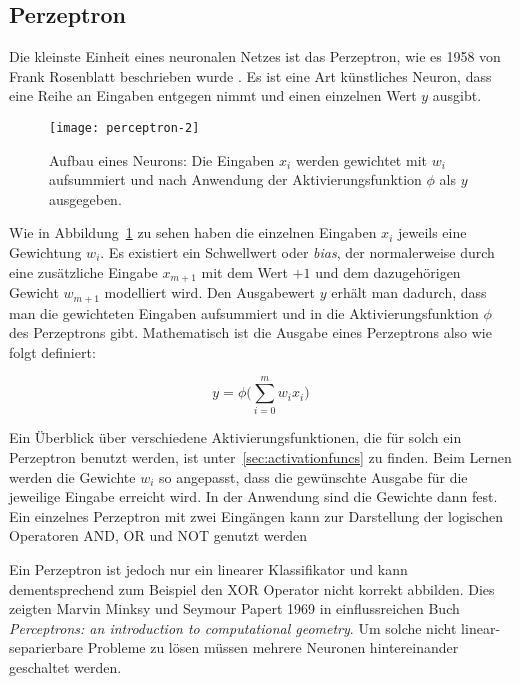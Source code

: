 \subsection{Perzeptron}
Die kleinste Einheit eines neuronalen Netzes ist das Perzeptron, wie es 1958 von Frank Rosenblatt beschrieben wurde \cite{rosenblatt1958perceptron}.
Es ist eine Art künstliches Neuron, dass eine Reihe an Eingaben entgegen nimmt und einen einzelnen Wert \(y\) ausgibt.

\begin{figure}[h]
    \centering
	\texttt{[image: perceptron-2]}
	\caption[Schematischer Aufbau Neuron]{Aufbau eines Neurons: Die Eingaben $x_i$ werden gewichtet mit $w_i$ aufsummiert und nach Anwendung der Aktivierungsfunktion $\phi$ als $y$ ausgegeben.}
	\label{fig:singleNeuron}
\end{figure}

Wie in Abbildung~\ref{fig:singleNeuron} zu sehen haben die einzelnen Eingaben \(x_i\) jeweils eine Gewichtung \(w_i\).
Es existiert ein Schwellwert oder \textit{bias}, der normalerweise 
durch eine zusätzliche Eingabe \(x_{m+1}\) mit dem Wert \(+1\) und dem dazugehörigen Gewicht \(w_{m+1}\) modelliert wird.
Den Ausgabewert \(y\) erhält man dadurch, dass man die gewichteten Eingaben aufsummiert und in die Aktivierungsfunktion \( \phi \) des Perzeptrons gibt.
Mathematisch ist die Ausgabe eines Perzeptrons also wie folgt definiert:

\begin{equation}
	y = \phi \Big( \sum_{i= 0}^{m} w_i x_i \Big)
\end{equation}

Ein Überblick über verschiedene Aktivierungsfunktionen, die für solch ein Perzeptron benutzt werden, ist unter~\ref{sec:activationfuncs} zu finden.
Beim Lernen werden die Gewichte \(w_i\) so angepasst, dass die gewünschte Ausgabe für die jeweilige Eingabe erreicht wird.
In der Anwendung sind die Gewichte dann fest.
Ein einzelnes Perzeptron mit zwei Eingängen kann zur Darstellung der logischen Operatoren AND, OR und NOT genutzt werden

Ein Perzeptron ist jedoch nur ein linearer Klassifikator und kann dementsprechend zum Beispiel den XOR Operator nicht korrekt abbilden.
Dies zeigten Marvin Minksy und Seymour Papert 1969 in einflussreichen Buch \textit{Perceptrons: an introduction to computational geometry}. 
Um solche nicht linear-separierbare Probleme zu lösen müssen mehrere Neuronen hintereinander geschaltet werden.


